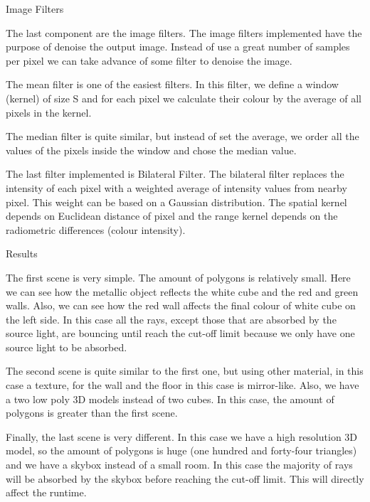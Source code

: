 \documentclass{beamer}
\begin{document}
\begin{frame}{Image Filters}
  
 The last component are the image filters. The image filters implemented have the purpose of denoise the output image. Instead of use a great number of samples per pixel we can take advance of some filter to denoise the image.

The mean filter is one of the easiest filters. In this filter, we define a window (kernel) of size S and for each pixel we calculate their colour by the average of all pixels in the kernel.

The median filter is quite similar, but instead of set the average, we order all the values of the pixels inside the window and chose the median value.

The last filter implemented is Bilateral Filter. The bilateral filter replaces the intensity of each pixel with a weighted average of intensity values from nearby pixel. This weight can be based on a Gaussian distribution. The spatial kernel depends on Euclidean distance of pixel and the range kernel depends on the radiometric differences (colour intensity).

   
\end{frame}

\begin{frame}{Results}

The first scene is very simple. The amount of polygons is relatively small. Here we can see how the metallic object reflects the white cube and the red and green walls. Also, we can see how the red wall affects the final colour of white cube on the left side. In this case all the rays, except those that are absorbed by the source light, are bouncing until reach the cut-off limit because we only have one source light to be absorbed.

The second scene is quite similar to the first one, but using other material, in this case a texture, for the wall and the floor in this case is mirror-like. Also, we have a two low poly 3D models instead of two cubes. In this case, the amount of polygons is greater than the first scene.

Finally, the last scene is very different. In this case we have a high resolution 3D model, so the amount of polygons is huge (one hundred and forty-four triangles) and we have a skybox instead of a small room. In this case the majority of rays will be absorbed by the skybox before reaching the cut-off limit. This will directly affect the runtime.


\end{frame}
\end{document}
